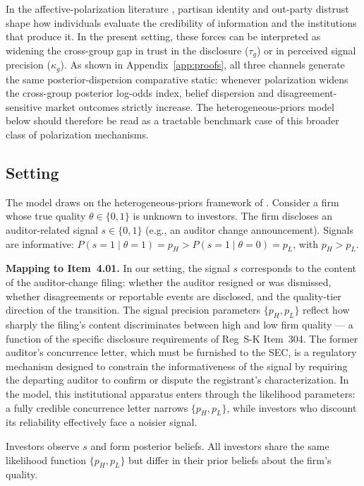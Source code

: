 \documentclass[12pt]{article}
\begin{document}
In the affective-polarization literature \citep{iyengar2012,
iyengar2019}, partisan identity and out-party distrust shape how individuals
evaluate the credibility of information and the institutions that produce it.
In the present setting, these forces can be interpreted as widening the
cross-group gap in trust in the disclosure ($\tau_g$) or in perceived
signal precision ($\kappa_g$). As shown in Appendix~\ref{app:proofs}, all
three channels generate the same posterior-dispersion comparative static:
whenever polarization widens the cross-group posterior log-odds index, belief
dispersion and disagreement-sensitive market outcomes strictly increase. The
heterogeneous-priors model below should therefore be read as a tractable
benchmark case of this broader class of polarization mechanisms.

\subsection{Setting}

The model draws on the heterogeneous-priors framework of \citet{kandel1995}.
Consider a firm whose true quality $\theta \in \{0, 1\}$ is unknown to
investors. The firm discloses an auditor-related signal $s \in \{0, 1\}$ (e.g.,
an auditor change announcement). Signals are informative: $P(s=1 \mid
\theta=1) = p_H > P(s=1 \mid \theta=0) = p_L$, with $p_H > p_L$.

\textbf{Mapping to Item~4.01.} In our setting, the signal $s$ corresponds
to the content of the auditor-change filing: whether the auditor resigned
or was dismissed, whether disagreements or reportable events are disclosed,
and the quality-tier direction of the transition. The signal precision
parameters $\{p_H, p_L\}$ reflect how sharply the filing's content
discriminates between high and low firm quality --- a function of the
specific disclosure requirements of Reg~S-K Item~304. The former auditor's
concurrence letter, which must be furnished to the SEC, is a regulatory
mechanism designed to constrain the informativeness of the signal by
requiring the departing auditor to confirm or dispute the registrant's
characterization. In the model, this institutional apparatus enters
through the likelihood parameters: a fully credible concurrence letter
narrows $\{p_H, p_L\}$, while investors who discount its reliability
effectively face a noisier signal.

Investors observe $s$ and form posterior beliefs. All investors share the
same likelihood function $\{p_H, p_L\}$ but differ in their prior beliefs
about the firm's quality.
\end{document}
